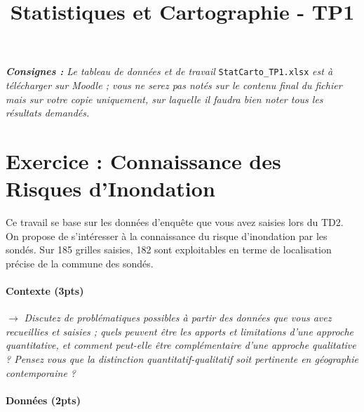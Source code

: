 





\title{\textbf{Statistiques et Cartographie - TP1}}

\date{}


\maketitle

\justify

\thispagestyle{firststyle}


\textit{\textbf{Consignes : }Le tableau de données et de travail }\texttt{StatCarto{\_}TP1.xlsx}\textit{ est à télécharger sur Moodle ; vous ne serez pas notés sur le contenu final du fichier mais sur votre copie uniquement, sur laquelle il faudra bien noter tous les résultats demandés.}


\bigskip


\section*{Exercice : Connaissance des Risques d'Inondation}

Ce travail se base sur les données d'enquête que vous avez saisies lors du TD2. On propose de s'intéresser à la connaissance du risque d'inondation par les sondés. Sur 185 grilles saisies, 182 sont exploitables en terme de localisation précise de la commune des sondés.


\paragraph{Contexte (3pts)}


$\rightarrow$ \textit{Discutez de problématiques possibles à partir des données que vous avez recueillies et saisies ; quels peuvent être les apports et limitations d'une approche quantitative, et comment peut-elle être complémentaire d'une approche qualitative ? Pensez vous que la distinction quantitatif-qualitatif soit pertinente en géographie contemporaine ?}




\paragraph{Données (2pts)}



